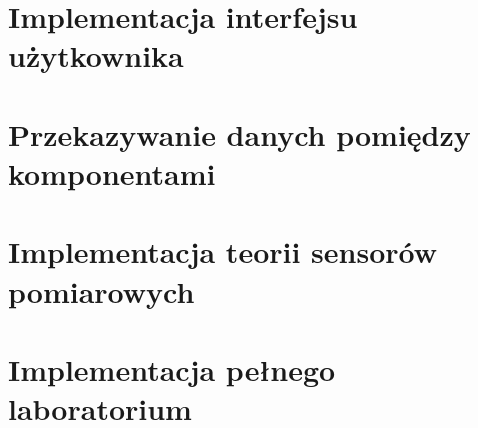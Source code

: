 \section{Implementacja interfejsu użytkownika}\label{sect:ui}


\section{Przekazywanie danych pomiędzy komponentami}\label{sect:context}


\section{Implementacja teorii sensorów pomiarowych}\label{sect:sensors-code}


\section{Implementacja pełnego laboratorium}\label{sect:laboratory}
